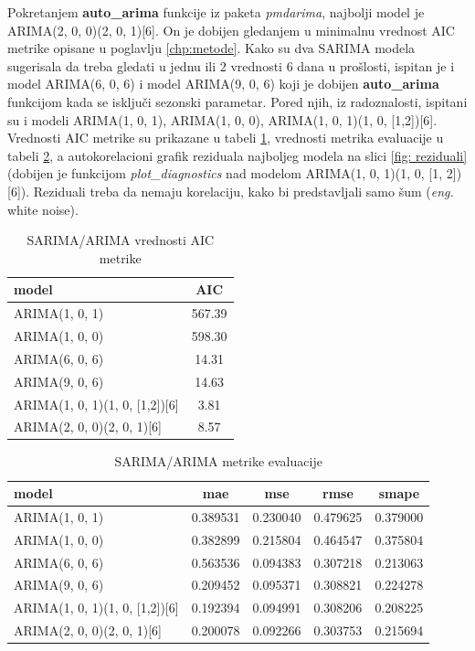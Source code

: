 \documentclass[12pt,oneside]{memoir}
\begin{document}
Pokretanjem \textbf{auto\_arima} funkcije iz paketa \textit{pmdarima}, najbolji model je ARIMA(2, 0, 0)(2, 0, 1)[6]. On je dobijen gledanjem u minimalnu vrednost AIC metrike opisane u poglavlju \ref{chp:metode}. Kako su dva SARIMA modela sugerisala da treba gledati u jednu ili 2 vrednosti 6 dana u prošlosti, ispitan je i model ARIMA(6, 0, 6) i model ARIMA(9, 0, 6) koji je dobijen \textbf{auto\_arima} funkcijom kada se isključi sezonski parametar. Pored njih, iz radoznalosti, ispitani su i modeli ARIMA(1, 0, 1), ARIMA(1, 0, 0), ARIMA(1, 0, 1)(1, 0, [1,2])[6]. Vrednosti AIC metrike su prikazane u tabeli \ref{tbl: arime_aic}, vrednosti metrika evaluacije u tabeli \ref{tbl: arime_metrike}, a autokorelacioni grafik reziduala najboljeg modela na slici \ref{fig: reziduali} (dobijen je funkcijom \textit{plot\_diagnostics} nad modelom ARIMA(1, 0, 1)(1, 0, [1, 2])[6]). Reziduali treba da nemaju korelaciju, kako bi predstavljali samo šum (\textit{eng.} white noise).

\begin{table}
\centering
\caption{SARIMA/ARIMA vrednosti AIC metrike}
\label{tbl: arime_aic}
\begin{tabular}{ |l|c| } 
\hline
model & AIC \\
\hline
ARIMA(1, 0, 1) & 567.39\\ 
ARIMA(1, 0, 0) & 598.30\\ 
ARIMA(6, 0, 6) & 14.31\\ 
ARIMA(9, 0, 6) & 14.63\\
ARIMA(1, 0, 1)(1, 0, [1,2])[6] & 3.81\\
ARIMA(2, 0, 0)(2, 0, 1)[6] & 8.57\\
\hline
\end{tabular}
\end{table}

\begin{table}
\centering
\caption{SARIMA/ARIMA metrike evaluacije}
\label{tbl: arime_metrike}
\begin{tabular}{ |l|c|c|c|c|} 
\hline
model & mae & mse & rmse & smape \\
\hline
ARIMA(1, 0, 1) & 0.389531 & 0.230040 & 0.479625 & 0.379000 \\ 
ARIMA(1, 0, 0) & 0.382899 & 0.215804 & 0.464547 & 0.375804\\ 
ARIMA(6, 0, 6) & 0.563536 & 0.094383 & 0.307218 & 0.213063\\ 
ARIMA(9, 0, 6) & 0.209452 & 0.095371 & 0.308821 & 0.224278\\ 
ARIMA(1, 0, 1)(1, 0, [1,2])[6] & 0.192394 & 0.094991 & 0.308206 & 0.208225\\
ARIMA(2, 0, 0)(2, 0, 1)[6] & 0.200078 & 0.092266 & 0.303753 & 0.215694\\
\hline
\end{tabular}
\end{table}
\end{document}
